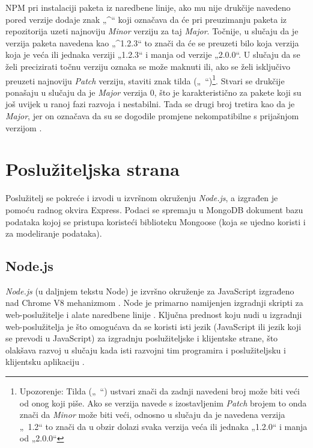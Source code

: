 \documentclass[times, utf8, diplomski, numeric]{fer}
\newcommand{\razmakp}{\vspace{18pt}}
\newcommand{\razmaks}{\vspace{10pt}}
\begin{document}
\razmakp

NPM pri instalaciji paketa iz naredbene linije, ako mu nije drukčije navedeno pored verzije dodaje znak „\string^“ koji označava da će pri preuzimanju paketa iz repozitorija uzeti najnoviju \emph{Minor} verziju za taj \emph{Major}.
Točnije, u slučaju da je verzija paketa navedena kao „\string^1.2.3“ to znači da će se preuzeti bilo koja verzija koja je veća ili jednaka verziji „1.2.3“ i manja od verzije „2.0.0“.
U slučaju da se želi precizirati točnu verziju oznaka se može maknuti ili, ako se želi isključivo preuzeti najnoviju \emph{Patch} verziju, staviti znak tilda („\string~“)\footnote{
    Upozorenje: Tilda („\string~“) ustvari znači da zadnji navedeni broj može biti veći od onog koji piše. Ako se verzija navede s izostavljenim \emph{Patch} brojem to onda znači da \emph{Minor} može biti veći, odnosno u slučaju da je navedena verzija „\string~1.2“ to znači da u obzir dolazi svaka verzija veća ili jednaka „1.2.0“ i manja od „2.0.0“
}.
Stvari se drukčije ponašaju u slučaju da je \emph{Major} verzija 0, što je karakteristično za pakete koji su još uvijek u ranoj fazi razvoja i nestabilni.
Tada se drugi broj tretira kao da je \emph{Major}, jer on označava da su se dogodile promjene nekompatibilne s prijašnjom verzijom \citep{npm_docs}.


\newpage
\section{Poslužiteljska strana}

Poslužitelj se pokreće i izvodi u izvršnom okruženju  \emph{Node.js}, a izgrađen je pomoću radnog okvira  Express.
Podaci se spremaju u MongoDB dokument bazu podataka  kojoj se pristupa koristeći biblioteku Mongoose (koja se ujedno koristi i za modeliranje podataka).


\razmaks
\subsection{Node.js}

\emph{Node.js} (u daljnjem tekstu Node) je izvršno okruženje za JavaScript izgrađeno nad Chrome V8 mehanizmom .
Node je primarno namijenjen izgradnji skripti za web-poslužitelje i alate naredbene linije .
Ključna prednost koju nudi u izgradnji web-poslužitelja je što omogućava da se koristi isti jezik (JavaScript ili jezik koji se prevodi u JavaScript) za izgradnju poslužiteljske i klijentske strane, što olakšava razvoj u slučaju kada isti razvojni tim programira i poslužiteljsku i klijentsku aplikaciju \citep{wiki_node}.
\end{document}
